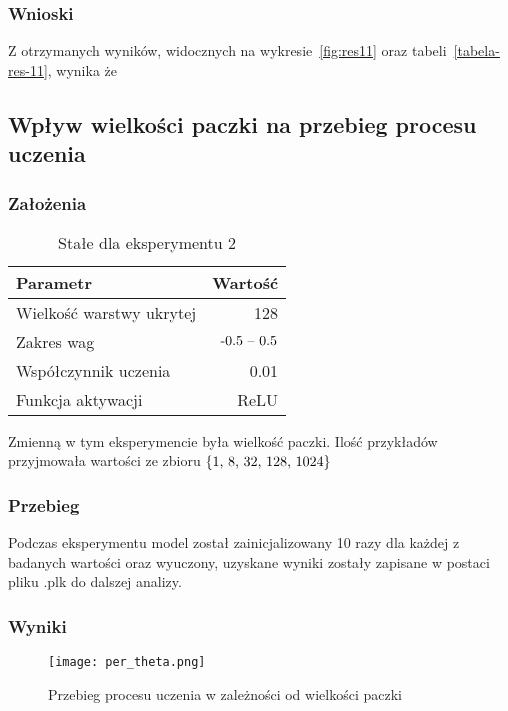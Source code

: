 \documentclass{article}
\begin{document}
\subsubsection*{Wnioski}

Z otrzymanych wyników, widocznych na wykresie~\ref{fig:res11} oraz tabeli~\ref{tabela-res-11}, wynika że

\newpage
\subsection{Wpływ wielkości paczki na przebieg procesu uczenia}
\subsubsection*{Założenia}
\begin{table}[!h]
	\caption{Stałe dla eksperymentu 2}
	\label{tabela-const-2}
	\centering
	\begin{tabular}{lr}
		\toprule
		Parametr                   & Wartość         \\
		\midrule
		Wielkość warstwy ukrytej & 128               \\
		Zakres wag                 & \($-0.5 -- 0.5$\) \\
		Współczynnik uczenia     & 0.01              \\
		Funkcja aktywacji          & ReLU              \\
		\bottomrule
	\end{tabular}
\end{table}

Zmienną w tym eksperymencie była wielkość paczki. Ilość przykładów przyjmowała wartości ze zbioru \(\{$1, 8, 32, 128, 1024$\}\)
\subsubsection*{Przebieg}

Podczas eksperymentu model został zainicjalizowany 10 razy dla każdej z badanych wartości oraz wyuczony, uzyskane wyniki zostały zapisane w postaci pliku .plk do dalszej analizy.

\subsubsection*{Wyniki}
\begin{figure}[!h]
	\centering
	\caption{Przebieg procesu uczenia w zależności od wielkości paczki}
	\texttt{[image: per\_theta.png]}
	\label{fig:res21}
\end{figure}
\end{document}

